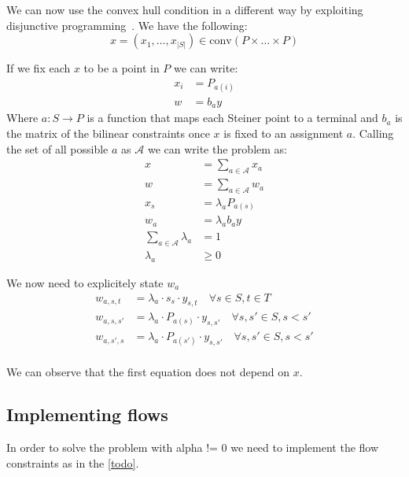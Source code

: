 \documentclass[12pt,a4paper]{article}
\numberwithin{equation}{section}
\theoremstyle{mytheorem}
\theoremstyle{myremark}
\theoremstyle{myparagraph}
\begin{document}
    We can now use the convex hull condition in a different way by exploiting disjunctive programming~\cite[2.11]{Conforti2014}.
    We have the following:
    \begin{equation}
        x = (x_1, \ldots, x_{|S|}) \in \text{conv}(P \times \ldots \times P)
    \end{equation}

    If we fix each $x$ to be a point in $P$ we can write:
    \begin{align}
        x_i &= P_{a(i)} \\
        w &= b_a y
    \end{align}
    Where $a: S \rightarrow P$ is a function that maps each Steiner point to a terminal and $b_a$ is the matrix of the bilinear
    constraints once $x$ is fixed to an assignment $a$.
    Calling the set of all possible $a$ as $\mathcal{A}$ we can write the problem as:
    \begin{align}
        x &= \sum_{a \in \mathcal{A}} x_a \\
        w &= \sum_{a \in \mathcal{A}} w_a \\
        x_s &= \lambda_a P_{a(s)} \\
        w_a &= \lambda_a b_a y \\
        \sum_{a \in \mathcal{A}} \lambda_a &= 1 \\
        \lambda_a &\geq 0
    \end{align}

    We now need to explicitely state $w_a$
    \begin{align}
        w_{a, s,t} &= \lambda_a \cdot s_s \cdot y_{s,t} \quad \forall s \in S, t \in T \\
        w_{a, s,s'} &= \lambda_a \cdot P_{a(s)} \cdot y_{s,s'} \quad \forall s, s' \in S, s < s' \\
        w_{a, s',s} &= \lambda_a \cdot P_{a(s')} \cdot y_{s,s'} \quad \forall s, s' \in S, s < s' \\
    \end{align}

    We can observe that the first equation does not depend on $x$.


    \subsection{Implementing flows}

    In order to solve the problem with alpha != 0 we need to implement the flow constraints as in the \ref{todo}.
\end{document}
